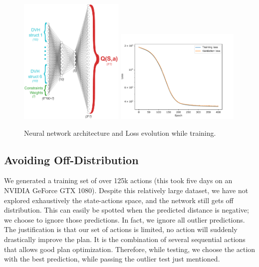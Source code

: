 \begin{figure}
	\centering
	\includegraphics[width=5cm]{architecture_all_actions.pdf}
	\hspace{0.5cm}
	\includegraphics[width=6cm]{losses-distance.pdf}
	\caption{Neural network architecture and Loss evolution while training.}
	\label{fig:architecture}
	\label{fig:losses_training}
\end{figure}

\subsection{Avoiding Off-Distribution}
We generated a training set of over 125k actions (this took five days on an NVIDIA GeForce GTX 1080).
Despite this relatively large dataset, we have not explored exhaustively the state-actions space, and the network still gets off distribution.
This can easily be spotted when the predicted distance is negative; we choose to ignore those predictions.
In fact, we ignore all outlier predictions.
The justification is that our set of actions is limited, no action will suddenly drastically improve the plan.
It is the combination of several sequential actions that allows good plan optimization.
Therefore, while testing, we choose the action with the best prediction, while passing the outlier test just mentioned.

